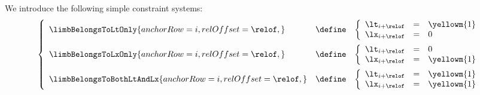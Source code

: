 We introduce the following simple constraint systems:
\[
	\left\{ \begin{array}{lcl}
		\limbBelongsToLtOnly {
			anchorRow = i      ,
			relOffset = \relof ,
		}
		& \define &
		\left\{ \begin{array}{lcl}
			\lt _{i + \relof} & = & \yellowm{1} \\
			\lx _{i + \relof} & = & 0 \\
		\end{array} \right.
		\vspace{2mm}
		\\
		\limbBelongsToLxOnly {
			anchorRow = i      ,
			relOffset = \relof ,
		}
		& \define &
		\left\{ \begin{array}{lcl}
			\lt _{i + \relof} & = & 0 \\
			\lx _{i + \relof} & = & \yellowm{1} \\
		\end{array} \right.
		\vspace{2mm}
		\\
		\limbBelongsToBothLtAndLx {
			anchorRow = i      ,
			relOffset = \relof ,
		}
		& \define &
		\left\{ \begin{array}{lcl}
			\lt _{i + \relof} & = & \yellowm{1} \\
			\lx _{i + \relof} & = & \yellowm{1} \\
		\end{array} \right.
		\\
	\end{array} \right.
\]
